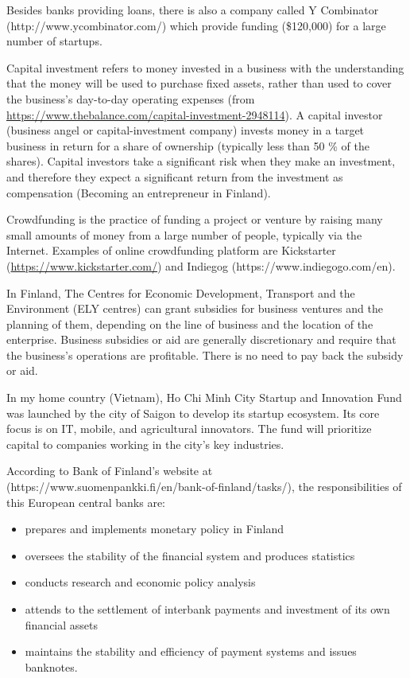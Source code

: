 \documentclass[12pt]{article}
\begin{document}
Besides banks providing loans, there is also a company called Y Combinator (http://www.ycombinator.com/) which provide funding (\$120,000) for a large number of startups.

Capital investment refers to money invested in a business with the understanding that the money will be used to purchase fixed assets, rather than used to cover the business's day-to-day operating expenses (from \url{https://www.thebalance.com/capital-investment-2948114}). A capital investor (business angel or capital-investment company) invests money in a target business in return for a share of ownership (typically less than 50 \% of the shares). Capital investors take a significant risk when they make an investment, and therefore they expect a significant return from the investment as compensation (Becoming an entrepreneur in Finland).

Crowdfunding is the practice of funding a project or venture by raising many small amounts of money from a large number of people, typically via the Internet. Examples of online crowdfunding platform are Kickstarter (\url{https://www.kickstarter.com/}) and Indiegog (https://www.indiegogo.com/en).

In Finland, The Centres for Economic Development, Transport and the Environment (ELY centres) can grant subsidies for business ventures and the planning of them, depending on the line of business and the location of the enterprise. Business subsidies or aid are generally discretionary and require that the business's operations are profitable. There is no need to pay back the subsidy or aid.

In my home country (Vietnam), Ho Chi Minh City Startup and Innovation Fund was launched by the city of Saigon to develop its startup ecosystem. Its core focus is on IT, mobile, and agricultural innovators. The fund will prioritize capital to companies working in the city's key industries.

According to Bank of Finland's website at (https://www.suomenpankki.fi/en/bank-of-finland/tasks/), the responsibilities of this European central banks are:

\begin{itemize}
	\item{prepares and implements monetary policy in Finland}
	\item{oversees the stability of the financial system and produces statistics}
	\item{conducts research and economic policy analysis}
	\item{attends to the settlement of interbank payments and investment of its own financial assets}
	\item{maintains the stability and efficiency of payment systems and issues banknotes.}
\end{itemize}
\end{document}
